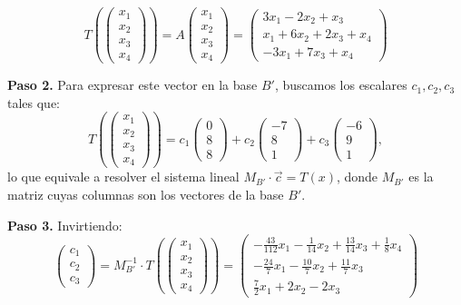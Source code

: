 \begin{prob}
\begin{myproof}
\[
T\left(\begin{pmatrix} x_1 \\ x_2 \\ x_3 \\ x_4 \end{pmatrix}\right) = A \begin{pmatrix} x_1 \\ x_2 \\ x_3 \\ x_4 \end{pmatrix}
= \begin{pmatrix}
3x_1 - 2x_2 + x_3 \\
x_1 + 6x_2 + 2x_3 + x_4 \\
-3x_1 + 7x_3 + x_4
\end{pmatrix}
\]

\textbf{Paso 2.} Para expresar este vector en la base $B'$, buscamos los escalares $c_1, c_2, c_3$ tales que:
\[
T\left(\begin{pmatrix} x_1 \\ x_2 \\ x_3 \\ x_4 \end{pmatrix}\right) = c_1 \begin{pmatrix} 0 \\ 8 \\ 8 \end{pmatrix} + c_2 \begin{pmatrix} -7 \\ 8 \\ 1 \end{pmatrix} + c_3 \begin{pmatrix} -6 \\ 9 \\ 1 \end{pmatrix},
\]
lo que equivale a resolver el sistema lineal $M_{B'} \cdot \vec{c} = T(x)$, donde $M_{B'}$ es la matriz cuyas columnas son los vectores de la base $B'$.

\textbf{Paso 3.} Invirtiendo:
\[
\begin{pmatrix}
c_1 \\
c_2 \\
c_3
\end{pmatrix}
=
M_{B'}^{-1} \cdot T\left(\begin{pmatrix} x_1 \\ x_2 \\ x_3 \\ x_4 \end{pmatrix}\right)
=
\begin{pmatrix}
-\frac{43}{112}x_1 - \frac{1}{14}x_2 + \frac{13}{14}x_3 + \frac{1}{8}x_4 \\
-\frac{24}{7}x_1 - \frac{10}{7}x_2 + \frac{11}{7}x_3 \\
\frac{7}{2}x_1 + 2x_2 - 2x_3
\end{pmatrix}
\]


\end{myproof}
\end{prob}
